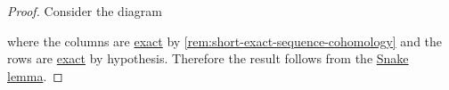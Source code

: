 \documentclass[../../main]{subfiles}
\begin{document}
\begin{proof}
  Consider the diagram
  \begin{center}
  \end{center}
  where the columns are \hyperref[def:exact-sequence]{exact} by \autoref{rem:short-exact-sequence-cohomology} and the rows are \hyperref[def:exact-sequence]{exact} by hypothesis.
  Therefore the result follows from the \hyperref[lemma:snake-lemma]{Snake lemma}.
\end{proof}
\end{document}
